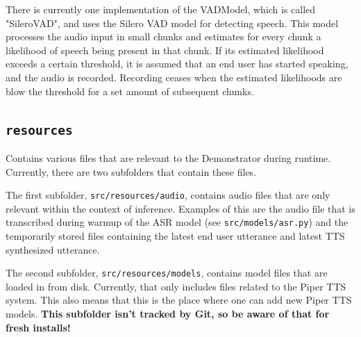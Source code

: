 There is currently one implementation of the VADModel, which is called "SileroVAD", and uses the Silero VAD model for detecting speech.
This model processes the audio input in small chunks and estimates for every chunk a likelihood of speech being present in that chunk.
If its estimated likelihood exceeds a certain threshold, it is assumed that an end user has started speaking, and the audio is recorded.
Recording ceases when the estimated likelihoods are blow the threshold for a set amount of subsequent chunks.

\subsection{\texttt{resources}}
Contains various files that are relevant to the Demonstrator during runtime.
Currently, there are two subfolders that contain these files.

The first subfolder, \texttt{src/resources/audio}, contains audio files that are only relevant within the context of inference.
Examples of this are the audio file that is transcribed during warmup of the ASR model (see \texttt{src/models/asr.py}) and the temporarily stored files containing the latest end user utterance and latest TTS synthesized utterance.

The second subfolder, \texttt{src/resources/models}, contains model files that are loaded in from disk.
Currently, that only includes files related to the Piper TTS system.
This also means that this is the place where one can add new Piper TTS models.
\textbf{This subfolder isn't tracked by Git, so be aware of that for fresh installs!}

